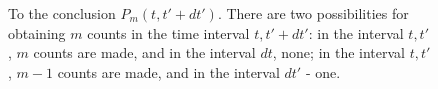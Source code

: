 \begin{figure}
\centering



\caption{To the conclusion $P_m\left(t, t' + dt'\right)$. There are two possibilities for obtaining $m$ counts in the time interval $t, t' + dt'$: in the interval $t, t'$, $m$ counts are made, and in the interval $dt$, none; in the interval $t, t'$, $m - 1$ counts are made, and in the interval $dt'$ - one.}
\label{figPart4Ch2_5}
\end{figure}